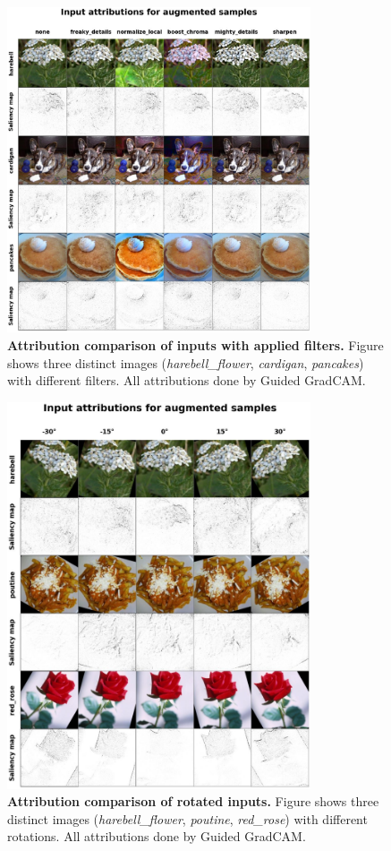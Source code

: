\begin{figure}[ht]
  \centering
  \includegraphics[width=0.8\textwidth]{appendixes/images/filters-sample.jpg}
  \caption{\textbf{Attribution comparison of inputs with applied filters.} Figure shows three distinct images (\textit{harebell\_flower}, \textit{cardigan}, \textit{pancakes}) with different filters. All attributions done by Guided GradCAM.}\label{fig:filters-samples}
\end{figure}

\begin{figure}[ht]
  \centering
  \includegraphics[width=0.8\textwidth]{appendixes/images/rotation-sample.jpg}
  \caption{\textbf{Attribution comparison of rotated inputs.} Figure shows three distinct images (\textit{harebell\_flower}, \textit{poutine}, \textit{red\_rose}) with different rotations. All attributions done by Guided GradCAM.}\label{fig:rotation-samples}
\end{figure}